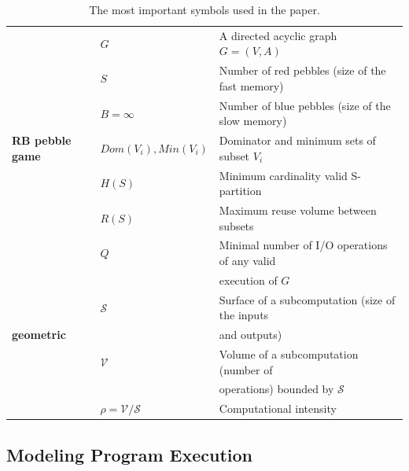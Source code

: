 \documentclass[sigplan,review,anonymous]{acmart}\settopmatter{printfolios=true,printccs=false,printacmref=false}
\begin{document}
\begin{table}[h!]
	\centering
	\footnotesize
	\sf
	\begin{tabular}{@{}l|ll@{}}
		\toprule
		\multirow{7}{*}{\begin{turn}{90}\textbf{RB pebble game}\end{turn}}
		& $G$&A directed acyclic graph $G=(V,A)$\\
		& $S$ & Number of red pebbles (size of the fast memory)\\
		& $B = \infty$ & Number of blue pebbles (size of the slow memory)\\
		& $Dom(V_i), Min(V_i)$ & Dominator and minimum sets of subset $V_i$\\
		& $H(S)$ & Minimum cardinality valid S-partition \\
		& $R(S)$ & Maximum reuse volume between subsets \\
		& $Q$ & Minimal number of I/O operations of any valid \\ 
		& & execution of $G$ \\
		\midrule
		\multirow{3}{*}{\begin{turn}{90}\textbf{geometric}\end{turn}}           
		& $\mathcal{S}$ & Surface of a subcomputation (size of the 
		inputs \\
		& &  and outputs)\\
		& $\mathcal{V}$ & Volume of a subcomputation (number of \\
		& & 
		operations) bounded by $\mathcal{S}$\\
		& $\rho = \mathcal{V}/\mathcal{S}$ & Computational 
		intensity \\
		\midrule
		
		\bottomrule
	\end{tabular}
	\caption{The most important symbols used in the paper.}
	\label{tab:symbols}
	\vspace{-0.5em}
\end{table}

\subsection{Modeling Program Execution}
\end{document}
